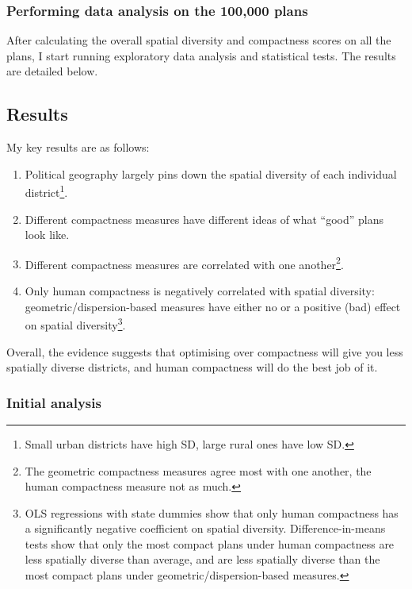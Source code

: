 \documentclass[]{article}
\providecommand{\tightlist}{%
  \setlength{\itemsep}{0pt}\setlength{\parskip}{0pt}}
\begin{document}
\hypertarget{performing-data-analysis-on-the-100000-plans}{%
\subsubsection{Performing data analysis on the 100,000
plans}\label{performing-data-analysis-on-the-100000-plans}}

After calculating the overall spatial diversity and compactness scores
on all the plans, I start running exploratory data analysis and
statistical tests. The results are detailed below.

\hypertarget{results}{%
\subsection{Results}\label{results}}

My key results are as follows:

\begin{enumerate}
\def\labelenumi{\arabic{enumi}.}
\tightlist
\item
  Political geography largely pins down the spatial diversity of each
  individual district\footnote{Small urban districts have high SD, large
    rural ones have low SD.}.
\item
  Different compactness measures have different ideas of what ``good''
  plans look like.
\item
  Different compactness measures are correlated with one
  another\footnote{The geometric compactness measures agree most with
    one another, the human compactness measure not as much.}.
\item
  Only human compactness is negatively correlated with spatial
  diversity: geometric/dispersion-based measures have either no or a
  positive (bad) effect on spatial diversity\footnote{OLS regressions
    with state dummies show that only human compactness has a
    significantly negative coefficient on spatial diversity.
    Difference-in-means tests show that only the most compact plans
    under human compactness are less spatially diverse than average, and
    are less spatially diverse than the most compact plans under
    geometric/dispersion-based measures.}.
\end{enumerate}

Overall, the evidence suggests that optimising over compactness will
give you less spatially diverse districts, and human compactness will do
the best job of it.

\hypertarget{initial-analysis}{%
\subsubsection{Initial analysis}\label{initial-analysis}}
\end{document}
